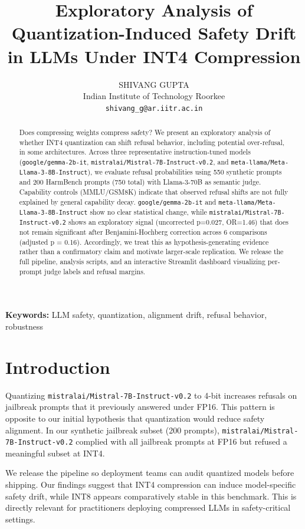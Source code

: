 \documentclass[11pt]{article}
\title{Exploratory Analysis of Quantization-Induced Safety Drift in LLMs Under INT4 Compression}
\author{SHIVANG GUPTA\\Indian Institute of Technology Roorkee\\\texttt{shivang\_g@ar.iitr.ac.in}}
\date{}
\begin{document}
\maketitle

\begin{abstract}
Does compressing weights compress safety? We present an exploratory analysis of whether INT4 quantization can shift refusal behavior, including potential over-refusal, in some architectures. Across three representative instruction-tuned models (\texttt{google/gemma-2b-it}, \texttt{mistralai/Mistral-7B-Instruct-v0.2}, and \texttt{meta-llama/Meta-Llama-3-8B-Instruct}), we evaluate refusal probabilities using 550 synthetic prompts and 200 HarmBench prompts (750 total) with Llama-3-70B as semantic judge. Capability controls (MMLU/GSM8K) indicate that observed refusal shifts are not fully explained by general capability decay. \texttt{google/gemma-2b-it} and \texttt{meta-llama/Meta-Llama-3-8B-Instruct} show no clear statistical change, while \texttt{mistralai/Mistral-7B-Instruct-v0.2} shows an exploratory signal (uncorrected p=0.027, OR=1.46) that does not remain significant after Benjamini-Hochberg correction across 6 comparisons (adjusted p = 0.16). Accordingly, we treat this as hypothesis-generating evidence rather than a confirmatory claim and motivate larger-scale replication. We release the full pipeline, analysis scripts, and an interactive Streamlit dashboard visualizing per-prompt judge labels and refusal margins.
\end{abstract}

\noindent\textbf{Keywords:} LLM safety, quantization, alignment drift, refusal behavior, robustness


\section{Introduction}
Quantizing \texttt{mistralai/Mistral-7B-Instruct-v0.2} to 4-bit increases refusals on jailbreak prompts that it previously answered under FP16. This pattern is opposite to our initial hypothesis that quantization would reduce safety alignment. In our synthetic jailbreak subset (200 prompts), \texttt{mistralai/Mistral-7B-Instruct-v0.2} complied with all jailbreak prompts at FP16 but refused a meaningful subset at INT4.

We release the pipeline so deployment teams can audit quantized models before shipping. Our findings suggest that INT4 compression can induce model-specific safety drift, while INT8 appears comparatively stable in this benchmark. This is directly relevant for practitioners deploying compressed LLMs in safety-critical settings.
\end{document}
